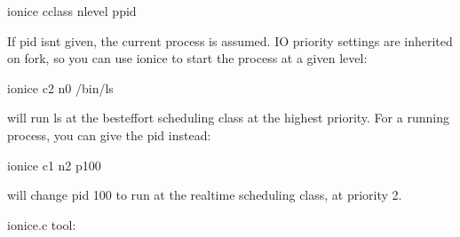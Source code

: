 \documentclass[a4paper,11pt,english]{sphinxmanual}
\begin{document}
\begin{sphinxVerbatim}[commandchars=\\\{\}]
\PYGZsh{} ionice \PYGZhy{}c\PYGZlt{}class\PYGZgt{} \PYGZhy{}n\PYGZlt{}level\PYGZgt{} \PYGZhy{}p\PYGZlt{}pid\PYGZgt{}
\end{sphinxVerbatim}

If pid isn\textquotesingle{}t given, the current process is assumed. IO priority settings
are inherited on fork, so you can use ionice to start the process at a given
level:

\begin{sphinxVerbatim}[commandchars=\\\{\}]
\PYGZsh{} ionice \PYGZhy{}c2 \PYGZhy{}n0 /bin/ls
\end{sphinxVerbatim}

will run ls at the best\sphinxhyphen{}effort scheduling class at the highest priority.
For a running process, you can give the pid instead:

\begin{sphinxVerbatim}[commandchars=\\\{\}]
\PYGZsh{} ionice \PYGZhy{}c1 \PYGZhy{}n2 \PYGZhy{}p100
\end{sphinxVerbatim}

will change pid 100 to run at the realtime scheduling class, at priority 2.

ionice.c tool:
\end{document}
